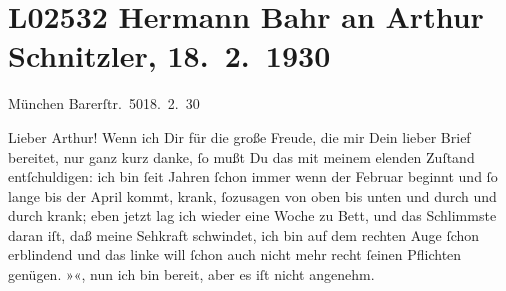 

\section[Hermann Bahr an Arthur Schnitzler, 18. 2. 1930]{L02532 Hermann Bahr an Arthur Schnitzler, 18. 2. 1930}
\nopagebreak{}
\rehead{ }\normalsize\beginnumbering{}
\toendnotes[C]{\smallbreak\pagebreak[2]}
\toendnotes[C]{\smallbreak}
\pstart
           \raggedleft{}{\pb}München Barerſtr. 5018. 2. 30\pend
           
\pstart{}Lieber Arthur!\pend\vspace{0.5em}
\pstart
           Wenn ich Dir für die große Freude, die mir Dein lieber Brief bereitet, nur ganz kurz
                   danke, ſo mußt Du das mit meinem elenden
               Zuſtand entſchuldigen: ich bin ſeit Jahren ſchon immer wenn der Februar beginnt und
               ſo lange bis der April kommt, krank, ſozusagen von oben bis unten und durch und durch
               krank; eben jetzt lag ich wieder eine Woche zu Bett, und das Schlimmste daran iſt,
               daß meine Sehkraft schwindet, ich bin auf dem rechten Auge ſchon erblindend und das
               linke will ſchon auch nicht mehr recht ſeinen Pflichten genügen. »\label{K_L02532-1v}\label{K_L02532-1}«, nun ich bin bereit, aber es iſt nicht angenehm.\pend
           
